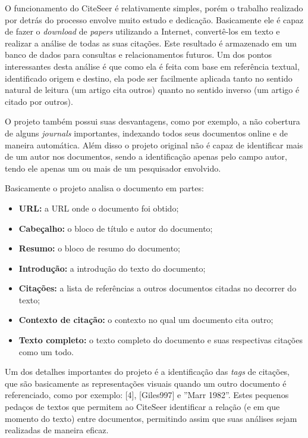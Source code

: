 O funcionamento do CiteSeer é relativamente simples, porém o trabalho realizado por detrás do processo envolve muito estudo e dedicação. Basicamente ele é capaz de fazer o \textit{download} de \textit{papers} utilizando a Internet, convertê-los em texto e realizar a análise de todas as suas citações. Este resultado é armazenado em um banco de dados para consultas e relacionamentos futuros. Um dos pontos interessantes desta análise é que como ela é feita com base em referência textual, identificado origem e destino, ela pode ser facilmente aplicada tanto no sentido natural de leitura (um artigo cita outros) quanto no sentido inverso (um artigo é citado por outros). 

O projeto também possui suas desvantagens, como por exemplo, a não cobertura de alguns \textit{journals} importantes, indexando todos seus documentos online e de maneira automática. Além disso o projeto original não é capaz de identificar mais de um autor nos documentos, sendo a identificação apenas pelo campo autor, tendo ele apenas um ou mais de um pesquisador envolvido.

Basicamente o projeto analisa o documento em partes:

\begin{itemize}
\item \textbf{URL:} a URL onde o documento foi obtido;
\item \textbf{Cabeçalho:} o bloco de título e autor do documento;
\item \textbf{Resumo:} o bloco de resumo do documento;
\item \textbf{Introdução:} a introdução do texto do documento;
\item \textbf{Citações:} a lista de referências a outros documentos citadas no decorrer do texto;
\item \textbf{Contexto de citação:} o contexto no qual um documento cita outro;
\item \textbf{Texto completo:} o texto completo do documento e suas respectivas citações como um todo.
\end{itemize}

Um dos detalhes importantes do projeto é a identificação das \textit{tags} de citações, que são basicamente as representações visuais quando um outro documento é referenciado, como por exemplo: [4], [Giles997] e ''Marr 1982''. Estes pequenos pedaços de textos que permitem ao CiteSeer identificar a relação (e em que momento do texto) entre documentos, permitindo assim que suas análises sejam realizadas de maneira eficaz.

